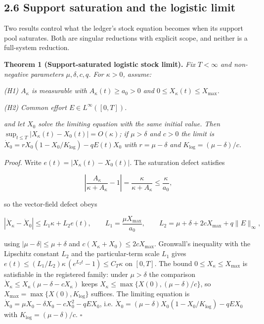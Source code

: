 \documentclass[11pt]{article}
\begin{document}
\subsection*{2.6 Support saturation and the logistic limit}\label{26-support-saturation-and-the-logistic-limit}

Two results control what the ledger's stock equation becomes when its support pool saturates. Both are singular reductions with explicit scope, and neither is a full-system reduction.

\textbf{Theorem 1 (Support-saturated logistic stock limit).} \emph{Fix \(T < \infty\) and non-negative parameters \(\mu, \delta, c, q\). For \(\kappa > 0\), assume:}

\emph{(H1) \(A_\kappa\) is measurable with \(A_\kappa(t) \ge a_0 > 0\) and \(0 \le X_\kappa(t) \le X_{\max}\).}

\emph{(H2) Common effort \(E \in L^\infty([0,T])\).}

\emph{and let \(X_0\) solve the limiting equation with the same initial value. Then \(\sup_{t \le T} |X_\kappa(t) - X_0(t)| =\allowbreak{} O(\kappa)\); if \(\mu > \delta\) and \(c > 0\) the limit is \(\dot X_0 =\allowbreak{} rX_0(1 - X_0/\allowbreak{}K_{\log}) - qE(t)X_0\) with \(r = \mu - \delta\) and \(K_{\log} = (\mu - \delta)/c\).}

\emph{Proof.} Write \(e(t) = |X_\kappa(t) - X_0(t)|\). The saturation defect satisfies 

$$\left| \frac{A_\kappa}{\kappa + A_\kappa} - 1 \right| = \frac{\kappa}{\kappa + A_\kappa} \le \frac{\kappa}{a_0},$$

 so the vector-field defect obeys 

$$|\dot X_\kappa - \dot X_0| \le L_1 \kappa + L_2 e(t), \qquad L_1 = \frac{\mu X_{\max}}{a_0}, \qquad L_2 = \mu + \delta + 2cX_{\max} + q\|E\|_\infty,$$

 using \(|\mu - \delta| \le \mu +\allowbreak{} \delta\) and \(c(X_\kappa +\allowbreak{} X_0) \le 2cX_{\max}\). Gronwall's inequality with the Lipschitz constant \(L_2\) and the particular-term scale \(L_1\) gives \(e(t) \le (L_1/\allowbreak{}L_2)\kappa\,\allowbreak{}(e^{L_2 t} - 1) \le C_T \kappa\) on \([0,T]\). The bound \(0 \le X_\kappa \le X_{\max}\) is satisfiable in the registered family: under \(\mu > \delta\) the comparison \(\dot X_\kappa \le X_\kappa(\mu - \delta - cX_\kappa)\) keeps \(X_\kappa \le \max\{X(0),\allowbreak{} (\mu-\delta)/c\}\), so \(X_{\max} =\allowbreak{} \max\{X(0),\allowbreak{} K_{\log}\}\) suffices. The limiting equation is \(\dot X_0 =\allowbreak{} \mu X_0 - \delta X_0 - cX_0^2 - qE X_0\), i.e. \(\dot X_0 =\allowbreak{} (\mu - \delta)X_0 (1 - X_0/\allowbreak{}K_{\log}) - qE X_0\) with \(K_{\log} = (\mu - \delta)/c\). \(\square\)
\end{document}

